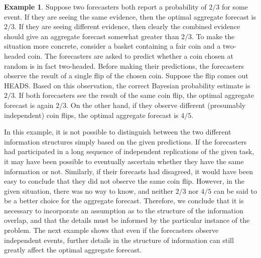 \documentclass[12pt]{article}
\theoremstyle{definition}
\newtheorem{example}[theorem]{Example}
\theoremstyle{definition}
\begin{document}
\begin{example}
\label{FirstExample}
Suppose two forecasters both report a probability of $2/3$ for some
event.  If they are seeing the same evidence, then the optimal aggregate
forecast is $2/3$.  If they are seeing different evidence,
then clearly the combined evidence should give an aggregate forecast
somewhat greater than $2/3$.  To make the situation more concrete, consider a basket containing a fair coin and a two-headed coin. The forecasters are asked to predict whether a coin chosen at random is in fact
two-headed. Before making their predictions, the forecasters observe the result of a single flip of
the chosen coin.  Suppose the flip comes out HEADS. Based on this observation, the correct Bayesian probability estimate is  $2/3$.
 If both forecasters see the
result of the same coin flip, the optimal aggregate forecast
 is again $2/3$. On the other hand, if they observe different (presumably
independent) coin flips, the optimal aggregate forecast 
is $4/5$.
\end{example}
In this example, it is not possible to distinguish between the two different information structures simply based on the given predictions. If the forecasters had participated in a long sequence of independent replications of the given task, it may have been possible to eventually ascertain whether they have the same information or not. Similarly, if their forecasts had disagreed, it would have been easy to conclude that they did not observe the same coin flip.  However, in the given situation, there
was no way to know, and neither $2/3$ nor $4/5$ can be said to be a
better choice for the aggregate forecast.  Therefore, we conclude that it is necessary to incorporate an assumption as to the structure of the information
overlap, and that the details must be informed by the particular
instance of the problem. The next example shows that even if the forecasters observe independent events, further details
in the structure of information can still greatly affect the
optimal aggregate forecast.
\end{document}
